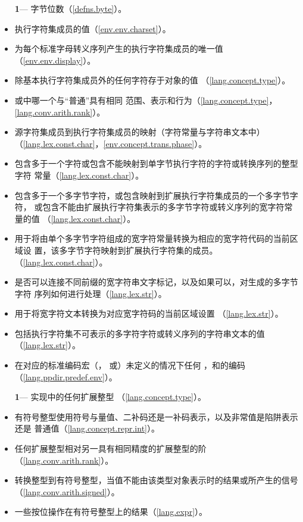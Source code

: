 \begin{itemize} %
  \item[\textbf{1}\hspace{5pt}---]{字节位数（\ref{defns.byte}）。}
  \item{执行字符集成员的值（\ref{env.env.charset}）。}
  \item{为每个标准字母转义序列产生的执行字符集成员的唯一值
    （\ref{env.env.display}）。}
  \item{除基本执行字符集成员外的任何字符存于对象的值
    （\ref{lang.concept.type}）。}
  \item{或中哪一个与``普通''具有相同
    范围、表示和行为（\ref{lang.concept.type}，\ref{lang.conv.arith.rank}）。}
  \item{源字符集成员到执行字符集成员的映射（字符常量与字符串文本中）
    （\ref{lang.lex.const.char}，\ref{env.concept.trans.phase}）。}
  \item{包含多于一个字符或包含不能映射到单字节执行字符的字符或转换序列的整型字符
    常量（\ref{lang.lex.const.char}）。}
  \item{包含多于一个多字节字符，或包含映射到扩展执行字符集成员的一个多字节字符，
    或包含不能由扩展执行字符集表示的多字节字符或转义序列的宽字符常量的值
    （\ref{lang.lex.const.char}）。}
  \item{用于将由单个多字节字符组成的宽字符常量转换为相应的宽字符代码的当前区域设
    置，该多字节字符映射到扩展执行字符集的成员。（\ref{lang.lex.const.char}）。}
  \item{是否可以连接不同前缀的宽字符串文字标记，以及如果可以，对生成的多字节字符
    序列如何进行处理（\ref{lang.lex.str}）。}
  \item{用于将宽字符文本转换为对应宽字符码的当前区域设置
    （\ref{lang.lex.str}）。}
  \item{包括执行字符集不可表示的多字符字符或转义序列的字符串文本的值
    （\ref{lang.lex.str}）。}
  \item{在对应的标准编码宏（，
    或）未定义的情况下任何
    ，和的编码
    （\ref{lang.ppdir.predef.env}）。}
\end{itemize}

\begin{itemize} %
  \item[\textbf{1}\hspace{5pt}---]{实现中的任何扩展整型
    （\ref{lang.concept.type}）。}
  \item{有符号整型使用符号与量值、二补码还是一补码表示，以及非常值是陷阱表示还是
    普通值（\ref{lang.concept.repr.int}）。}
  \item{任何扩展整型相对另一具有相同精度的扩展整型的阶
    （\ref{lang.conv.arith.rank}）。}
  \item{转换整型到有符号整型，当值不能由该类型对象表示时的结果或所产生的信号
    （\ref{lang.conv.arith.signed}）。}
  \item{一些按位操作在有符号整型上的结果（\ref{lang.expr}）。}
\end{itemize}

